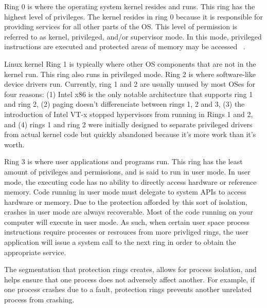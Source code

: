 \documentclass{report}
\begin{document}
\begin{spacing}{1.5}
{\large
Ring 0 is where the operating system kernel resides and runs. This ring has the highest level of privileges. The kernel resides in ring 0 because it is responsible for providing services for all other parts of the OS. This level of permission is referred to as kernel, privileged, and/or supervisor mode. In this mode, privileged instructions are executed and protected areas of memory may be accessed ~\cite{Wiley2011}.

Linux kernel Ring 1 is typically where other OS components that are not in the kernel run. This ring also runs in privileged mode. Ring 2 is where software-like device drivers run. Currently, ring 1 and 2 are usually unused by most OSes for four reasons: (1) Intel x86 is the only notable architecture that supports ring 1 and ring 2, (2) paging doesn't differenciate between rings 1, 2 and 3, (3) the introduction of Intel VT-x stopped hypervisors from running in Rings 1 and 2, and (4) rings 1 and ring 2 were initially designed to separate privileged drivers from actual kernel code but quickly abandoned because it's more work than it's worth. 

Ring 3 is where user applications and programs run. This ring has the least amount of privileges and permissions, and is said to run in user mode. In user mode, the executing code has no ability to directly access hardware or reference memory. Code running in user mode must delegate to system APIs to access hardware or memory. Due to the protection afforded by this sort of isolation, crashes in user mode are always recoverable. Most of the code running on your computer will execute in user mode. As such, when certain user space process instructions require processes or resrouces from more privliged rings, the user application will issue a system call to the next ring in order to obtain the appropriate service.
\newline
}

{\large
The segmentation that protection rings creates, allows for process isolation, and helps ensure that one process does not adversely affect another. For example, if one process crashes due to a fault, protection rings prevents another unrelated process from crashing.
}
\newpage

















\end{spacing}
\end{document}
